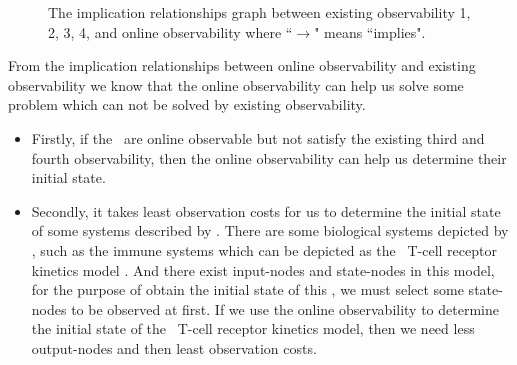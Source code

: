 \begin{figure}[thpb]
      \centering
      
      \caption{The implication relationships graph between existing observability 1, 2, 3, 4, and online observability where ``$\rightarrow$" means ``implies".}
      \label{fig:7}
   \end{figure}

From the implication relationships between online observability and existing observability we know that the online observability can help us solve some problem which can not be solved by existing observability. 
 \begin{itemize}
 \item Firstly, if the \BCNs\ are online observable but not satisfy the existing third and fourth observability, then the online observability can help us determine their initial state. 
 \item Secondly, it takes least observation costs for us to determine the initial state of some systems described by \BCNs. There are some biological systems depicted by \BCNs, such as the immune systems which can be depicted as the \BCN\ T-cell receptor kinetics model \cite{Klamt2006A}. And there exist input-nodes and state-nodes in this model, for the purpose of obtain the initial state of this \BCN, we must select some state-nodes to be observed at first. If we use the online observability to determine the initial state of the \BCN\ T-cell receptor kinetics model, then we need less output-nodes and then least observation costs.
 \end{itemize}


